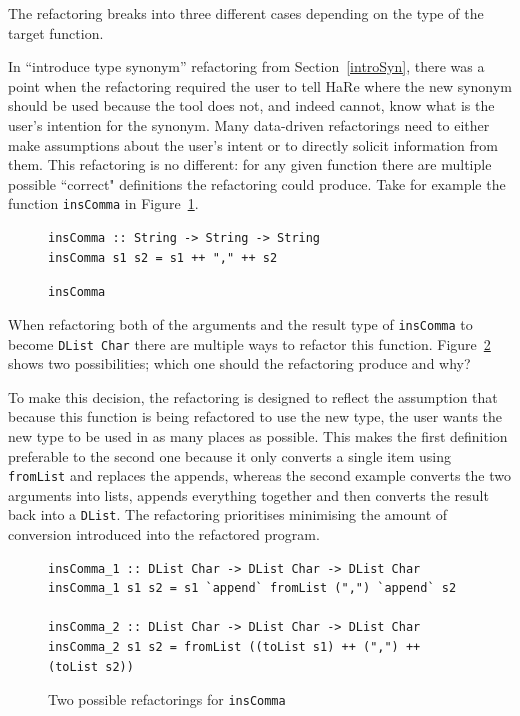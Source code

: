 The refactoring breaks into three different cases depending on the type of the target function. 

In ``introduce type synonym'' refactoring from Section~\ref{introSyn}, there was a point when the refactoring required the user to tell HaRe where the new synonym should be used because the tool does not, and indeed cannot, know what is the user's intention for the synonym. Many data-driven refactorings need to either make assumptions about the user's intent or to directly solicit information from them. This refactoring is no different: for any given function there are multiple possible ``correct" definitions the refactoring could produce. Take for example the function \texttt{insComma} in Figure~\ref{insComma}.

\begin{figure}[t]
\begin{lstlisting}
insComma :: String -> String -> String
insComma s1 s2 = s1 ++ "," ++ s2
\end{lstlisting} 
\caption{\texttt{insComma}}
\label{insComma}
\end{figure} 

When refactoring both of the arguments and the result type of \texttt{insComma} to become \texttt{DList Char} there are multiple ways to refactor this function. Figure~\ref{commaRef} shows two possibilities; which one should the refactoring produce and why?

To make this decision, the refactoring is designed to reflect the assumption that because this function is being refactored to use the new type, the user wants the new type to be used in as many places as possible. This makes the first definition preferable to the second one because it only converts a single item using \texttt{fromList} and replaces the appends, whereas the second example converts the two arguments into lists, appends everything together and then converts the result back into a \texttt{DList}. The refactoring prioritises minimising the amount of conversion introduced into the refactored program.  

\begin{figure}[t]
\begin{lstlisting}
insComma_1 :: DList Char -> DList Char -> DList Char
insComma_1 s1 s2 = s1 `append` fromList (",") `append` s2

insComma_2 :: DList Char -> DList Char -> DList Char
insComma_2 s1 s2 = fromList ((toList s1) ++ (",") ++ (toList s2))
\end{lstlisting}
\caption{Two possible refactorings for \texttt{insComma}}
\label{commaRef}
\end{figure}

